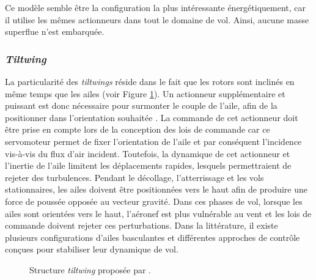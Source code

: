  
        Ce modèle semble être la configuration la plus intéressante énergétiquement, car il utilise les mêmes actionneurs dans tout le domaine de vol. Ainsi, aucune masse superflue n'est embarquée.

    
        \subsubsection*{\textit{Tiltwing}} 
        La particularité des \textit{tiltwings} réside dans le fait que les rotors sont inclinés en même temps que les ailes (voir Figure \ref{fig:tiltwing}). Un actionneur supplémentaire et puissant est donc nécessaire pour surmonter le couple de l'aile, afin de la positionner dans l'orientation souhaitée \cite{holsten2011design, rohr2019attitude, ccetinsoy2012design}. La commande de cet actionneur doit être prise en compte lors de la conception des lois de commande car ce servomoteur permet de fixer l'orientation de l'aile et par conséquent l'incidence vis-à-vis du flux d'air incident. Toutefois, la dynamique de cet actionneur et l'inertie de l'aile limitent les déplacements rapides, lesquels permettraient de rejeter des turbulences. Pendant le décollage, l'atterrissage et les vols stationnaires, les ailes doivent être positionnées vers le haut afin de produire une force de poussée opposée au vecteur gravité. Dans ces phases de vol, lorsque les ailes sont orientées vers le haut, l'aéronef est plus vulnérable au vent et les lois de commande doivent rejeter ces perturbations. Dans la littérature, il existe plusieurs configurations d'ailes basculantes et différentes approches de contrôle conçues pour stabiliser leur dynamique de vol.
        \begin{figure}[ht!]
            \centering
            \caption{Structure \textit{tiltwing}  proposée par \cite{Aero2_2024, Ostermann2012ControlCO}.}
            \label{fig:tiltwing}
        \end{figure}

